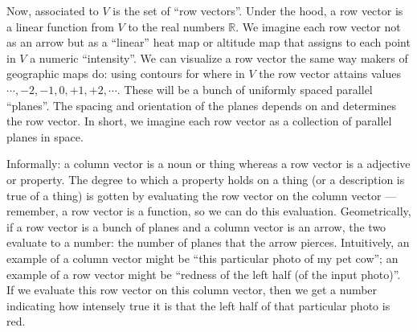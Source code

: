 \documentclass[11pt, justified]{tufte-book}
\newcommand{\Rr}{\mathbb{R}}\newcommand{\rR}{\mathcal{R}}
\theoremstyle{definition}
\begin{document}
        Now, associated to $V$ is the set of ``row vectors''.  Under the hood, a
        row vector is a linear function from $V$ to the real numbers $\Rr$.  We
        imagine each row vector not as an arrow but as a ``linear'' heat map or
        altitude map that assigns to each point in $V$ a numeric ``intensity''.
        We can visualize a row vector the same way makers of geographic maps
        do: using contours for where in $V$ the row vector attains values
        $\cdots,-2,-1,0,+1,+2,\cdots$.
        These will be a bunch of uniformly spaced parallel ``planes''.  The
        spacing and orientation of the planes depends on and determines the row
        vector.  In short, we imagine each row vector as a collection of
        parallel planes in space.

        Informally: a column vector is a noun or thing whereas a row vector is
        a adjective or property.  The degree to which a property holds on a
        thing (or a description is true of a thing) is gotten by evaluating the
        row vector on the column vector --- remember, a row vector is a
        function, so we can do this evaluation.  Geometrically, if a row vector
        is a bunch of planes and a column vector is an arrow, the two evaluate
        to a number: the number of planes that the arrow pierces.  Intuitively,
        an example of a column vector might be ``this particular photo of my
        pet cow''; an example of a row vector might be ``redness of the left
        half (of the input photo)''.  If we evaluate this row vector on this
        column vector, then we get a number indicating how intensely true it is
        that the left half of that particular photo is red.
        
\end{document}
